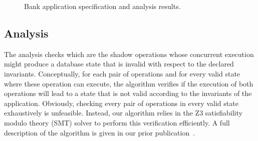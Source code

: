 \documentclass[11pt]{article}
\begin{document}
\begin{figure}[t!]
\centering
 \begin{minipage}[b]{0.49\columnwidth}
\centering
{}
\end{minipage}
 \begin{minipage}[b]{0.49\columnwidth}
\centering
{}
\end{minipage}
\caption{Bank application specification and analysis results.}
\end{figure}

\subsection{Analysis}
The analysis checks which are the shadow operations
whose concurrent execution might produce a
database state that is invalid with respect to the declared invariants.
Conceptually, for each pair of operations and for every valid state where
these operation can execute, the algorithm verifies if the execution of both
operations will lead to a state that is not valid according to the invariants
of the application.
Obviously, checking every pair of operations in every valid state
exhaustively is unfeasible. Instead, our algorithm relies in the
Z3 satisfiability modulo theory (SMT) solver to perform this verification
efficiently.
A full description of the algorithm is given in our prior publication~\cite{Balegas2015Indigo}.
\end{document}
